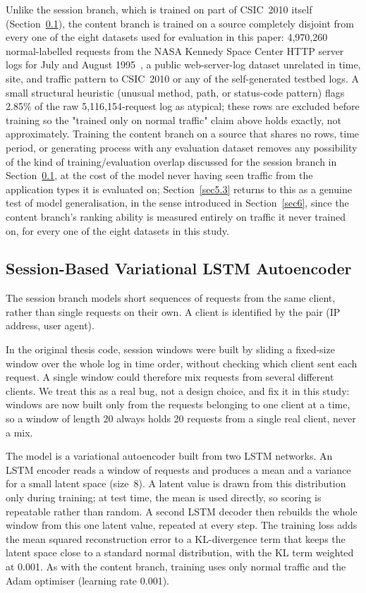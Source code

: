 \documentclass[futureinternet,article,submit,moreauthors]{Definitions/mdpi}
\begin{document}
Unlike the session branch, which is trained on part of CSIC~2010 itself (Section~\ref{sec4.5}), the content branch is trained on a source completely disjoint from every one of the eight datasets used for evaluation in this paper: 4,970,260 normal-labelled requests from the NASA Kennedy Space Center HTTP server logs for July and August 1995~\cite{arlitt1996}, a public web-server-log dataset unrelated in time, site, and traffic pattern to CSIC~2010 or any of the self-generated testbed logs. A small structural heuristic (unusual method, path, or status-code pattern) flags 2.85\% of the raw 5,116,154-request log as atypical; these rows are excluded before training so the "trained only on normal traffic" claim above holds exactly, not approximately. Training the content branch on a source that shares no rows, time period, or generating process with any evaluation dataset removes any possibility of the kind of training/evaluation overlap discussed for the session branch in Section~\ref{sec4.5}, at the cost of the model never having seen traffic from the application types it is evaluated on; Section~\ref{sec5.3} returns to this as a genuine test of model generalisation, in the sense introduced in Section~\ref{sec6}, since the content branch's ranking ability is measured entirely on traffic it never trained on, for every one of the eight datasets in this study.

\subsection{Session-Based Variational LSTM Autoencoder} \label{sec4.5}

The session branch models short sequences of requests from the same client, rather than single requests on their own. A client is identified by the pair (IP address, user agent).

In the original thesis code, session windows were built by sliding a fixed-size window over the whole log in time order, without checking which client sent each request. A single window could therefore mix requests from several different clients. We treat this as a real bug, not a design choice, and fix it in this study: windows are now built only from the requests belonging to one client at a time, so a window of length 20 always holds 20 requests from a single real client, never a mix.

The model is a variational autoencoder built from two LSTM networks. An LSTM encoder reads a window of requests and produces a mean and a variance for a small latent space (size~8). A latent value is drawn from this distribution only during training; at test time, the mean is used directly, so scoring is repeatable rather than random. A second LSTM decoder then rebuilds the whole window from this one latent value, repeated at every step. The training loss adds the mean squared reconstruction error to a KL-divergence term that keeps the latent space close to a standard normal distribution, with the KL term weighted at 0.001. As with the content branch, training uses only normal traffic and the Adam optimiser (learning rate 0.001).
\end{document}
